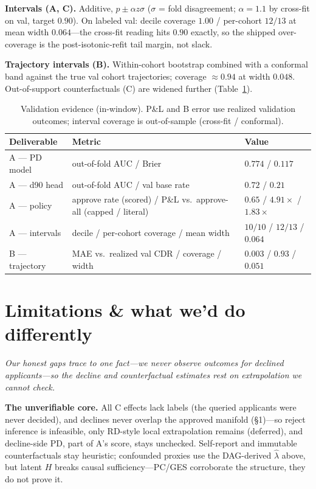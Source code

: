\documentclass[11pt]{article}
\begin{document}
\textbf{Intervals (A, C).} Additive, $p \pm \alpha z \sigma$ ($\sigma$ = fold disagreement;
$\alpha{=}1.1$ by cross-fit on val, target $0.90$). On labeled val: decile coverage $1.00$ /
per-cohort $12/13$ at mean width $0.064$---the cross-fit reading hits $0.90$ exactly, so the
shipped over-coverage is the post-isotonic-refit tail margin, not slack.

\textbf{Trajectory intervals (B).} Within-cohort bootstrap combined with a conformal band
against the true val cohort trajectories; coverage $\approx 0.94$ at width $0.048$.
Out-of-support counterfactuals (C) are widened further (Table~\ref{tab:val}).

\begin{table}[h]
\centering
\begin{tabular}{@{}lll@{}}
\toprule
Deliverable & Metric & Value \\
\midrule
A --- PD model & out-of-fold AUC / Brier & $0.774$ / $0.117$ \\
A --- d90 head & out-of-fold AUC / val base rate & $0.72$ / $0.21$ \\
A --- policy & approve rate (scored) / P\&L vs.\ approve-all (capped / literal) & $0.65$ / $4.91\times$ / $1.83\times$ \\
A --- intervals & decile / per-cohort coverage / mean width & $10{/}10$ / $12{/}13$ / $0.064$ \\
B --- trajectory & MAE vs.\ realized val CDR / coverage / width & $0.003$ / $0.93$ / $0.051$ \\
\bottomrule
\end{tabular}
\caption{Validation evidence (in-window). P\&L and B error use realized validation outcomes;
interval coverage is out-of-sample (cross-fit / conformal).}
\label{tab:val}
\end{table}

\section{Limitations \& what we'd do differently}

\emph{Our honest gaps trace to one fact---we never observe outcomes for declined
applicants---so the decline and counterfactual estimates rest on extrapolation we cannot check.}

\textbf{The unverifiable core.} All C effects lack labels (the queried applicants were never
decided), and declines never overlap the approved manifold (\S1)---so reject inference is
infeasible, only RD-style local extrapolation remains (deferred), and decline-side PD, part of
A's score, stays unchecked. Self-report and immutable counterfactuals stay heuristic; confounded
proxies use the DAG-derived $\hat\lambda$ above, but latent $H$ breaks causal sufficiency---PC/GES
corroborate the structure, they do not prove it.
\end{document}
